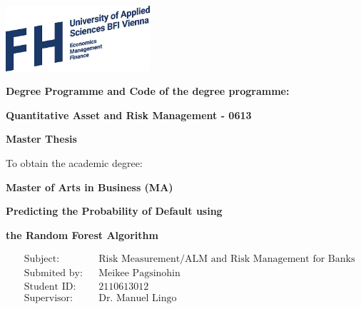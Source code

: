 \documentclass[12pt,twoside=false,headheight=-10pt, bibliography=numbered]{scrreprt} %
\begin{document}

\renewcommand{\thepage}{\Roman{page}}

\begin{titlepage}

\begin{flushright}
\includegraphics[width=0.4\textwidth]{figures/FHlogo2.jpeg}\par
\end{flushright}

\vspace{0.7cm}

\begin{flushleft}

\fontsize{12}{12}\selectfont
\textbf{Degree Programme and Code of the degree programme:}

\fontsize{14}{14}\selectfont
\textbf{Quantitative Asset and Risk Management - 0613}

\vspace{0.7cm}

\fontsize{20}{20}\selectfont
\textbf{Master Thesis}

\vspace{0.7cm}

\fontsize{12}{12}\selectfont
To obtain the academic degree:\par
\textbf{Master of Arts in Business (MA)}

\end{flushleft}

\vspace{1cm}

\begin{center}

\fontsize{16}{16}\selectfont
\textbf{Predicting the Probability of Default using} \par
\textbf{the Random Forest Algorithm}

\end{center}

\vspace{0.3cm}


\begin{fleqn}
\begin{align*}
& \text{Subject:} 		&& \text{Risk Measurement/ALM and Risk Management for Banks} 	\\
& \text{Submited by:} 	&& \text{Meikee Pagsinohin} 		\\
& \text{Student ID:} 	&& \text{2110613012} 				\\
& \text{Supervisor:} 	&& \text{Dr. Manuel Lingo}
\end{align*}
\end{fleqn}


\end{titlepage}
\end{document}
